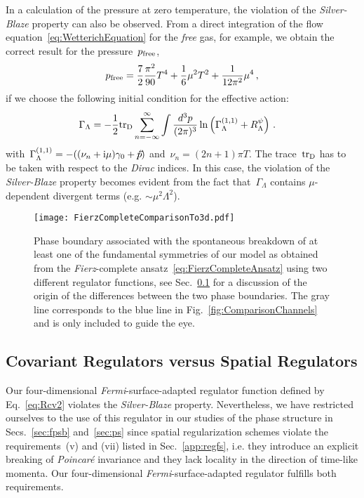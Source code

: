 \documentclass[prd,english,preprintnumbers,amsmath,amssymb,nofootinbib,twocolumn,superscriptaddress]{revtex4-1}
\newcommand{\I}{\mathrm{i}}
\newcommand{\be}{\begin{eqnarray}}
\newcommand{\ee}{\end{eqnarray}}
\newcommand{\fslash}{\hspace*{-0.2cm}\slash }
\begin{document}
{{In a calculation of the pressure at zero temperature, 
the violation of the {\it Silver-Blaze} property can also be observed. 
From a direct integration
of the flow equation~\eqref{eq:WetterichEquation} for the {\it free} gas, for example,
we obtain the correct result for the pressure~$p_{\rm free}$,
%
\be
p_{\rm free} = \frac{7}{2}\frac{\pi^2}{90}T^4 + \frac{1}{6}\mu^2 T^2 +\frac{1}{12\pi^2}\mu^4
\,,
\ee
%
if we choose the following initial condition for the effective action:
%
\be
\!\!\!\!\!\!\Gamma_{\Lambda}=-\frac{1}{2}\text{tr}_{\rm D}\sum_{n=-\infty}^{\infty}\int\frac{d^3p}{(2\pi)^3}\ln \left(
\Gamma^{(1,1)}_{\Lambda} + R_{\Lambda}^{\psi}\right)\,.
\ee
%
{with~$\Gamma^{(1,1)}_{\Lambda} =-( (\nu_n+\I\mu)\gamma_0 + \vec{p}\fslash)$ and~$\nu_n=(2n+1)\pi T$.}
The trace~$\text{tr}_{\rm D}$ has to be taken
with respect to the {\it Dirac} indices. In this case, the violation of the {\it Silver-Blaze} property  
becomes evident from the fact that~$\Gamma_{\Lambda}$ contains $\mu$-dependent divergent terms (e.g. $\sim\mu^2\Lambda^2$).
%
\begin{figure}[t]
\centering
\texttt{[image: FierzCompleteComparisonTo3d.pdf]}
\caption{Phase boundary associated with the spontaneous breakdown of at least one of the fundamental symmetries of our model 
as obtained from the {\it Fierz}-complete ansatz~\eqref{eq:FierzCompleteAnsatz} using 
two different regulator {functions, see Sec.~\ref{app:covregvsspreg} for a discussion
of the origin of the differences between the two phase boundaries. The gray line}
corresponds to the blue line in Fig.~\ref{fig:ComparisonChannels} and is only included to guide the eye.} 
\label{fig:pd3d}
\end{figure}
%

%
\subsection{Covariant Regulators versus Spatial Regulators}\label{app:covregvsspreg}
%

Our four-dimensional {\it Fermi}-surface-adapted 
regulator function defined by Eq.~\eqref{eq:Rcv2} violates the {\it Silver-Blaze} property.
Nevertheless, we have restricted 
ourselves to the use of this regulator
in our studies of the phase structure in Secs.~\ref{sec:fpsb} and~\ref{sec:ps}
since spatial regularization schemes
violate the requirements~(v) and (vii) listed in Sec.~\ref{app:regfs}, 
i.e. they introduce an explicit breaking of {\it Poincar\'{e}} invariance and they lack
locality in the direction of time-like momenta. 
Our four-dimensional {\it Fermi}-surface-adapted 
regulator fulfills both requirements.

}}
\end{document}
